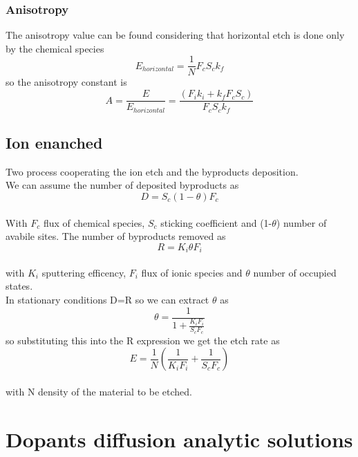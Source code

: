 \subsubsection{Anisotropy}
The anisotropy value can be found considering that horizontal etch is done only by the chemical species 
\begin{equation}
E_{horizontal}=\frac{1}{N}F_cS_ck_f
\end{equation}
so the anisotropy constant is 
\begin{equation}
A=\frac{E}{E_{horizontal}}=\frac{\left( F_ik_i+k_fF_cS_c \right)}{F_cS_ck_f}
\end{equation}


\subsection{Ion enanched}

Two process cooperating the ion etch and the byproducts deposition.\\
We can assume the number of deposited byproducts as
\begin{equation}
D=S_c(1-\theta)F_c
\end{equation}
\\
With $F_c$ flux of chemical species, $S_c$ sticking coefficient and (1-$\theta$) number of avabile sites.
The number of byproducts removed as
\begin{equation}
R=K_i\theta F_i
\end{equation}
\\
with $K_i$ sputtering efficency, $F_i$ flux of ionic species and $\theta$ number of occupied states.\\

In stationary conditions D=R so we can extract $\theta$ as
\begin{equation}
\theta=\frac{1}{1+\frac{K_iF_i}{S_cF_c}}
\end{equation}
so substituting this into the R expression we get the etch rate as 
\begin{equation}
E=\frac{1}{N}\left(\frac{1}{K_iF_i}+\frac{1}{S_cF_c}\right)
\end{equation}
\\
with N density of the material to be etched.\\

\section{Dopants diffusion analytic solutions}

